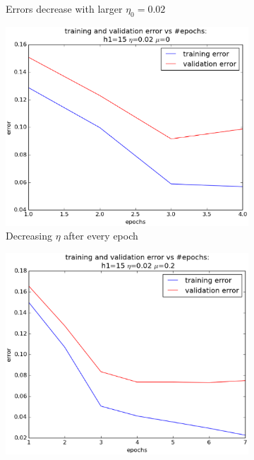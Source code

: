 \begin{itemize}
\begin{figure}[!ht]
\begin{subfigure}[b]{.45\textwidth}
		\caption{Errors decrease with larger $\eta_0=0.02$}
		\label{fig:larger_eta}
		\end{subfigure}
		\begin{subfigure}[b]{.45\textwidth}
		\centering
		\includegraphics[width=\textwidth]{mlp/plots/effect_eta_decrease.eps}
		\caption{Decreasing $\eta$ after every epoch}
		\label{fig:decrease_eta}
		\end{subfigure}
		\quad
		\begin{subfigure}[b]{.45\textwidth}
		\centering
		\includegraphics[width=\textwidth]{mlp/plots/effect_momentum.eps}

\end{subfigure}
\end{figure}
\end{itemize}
